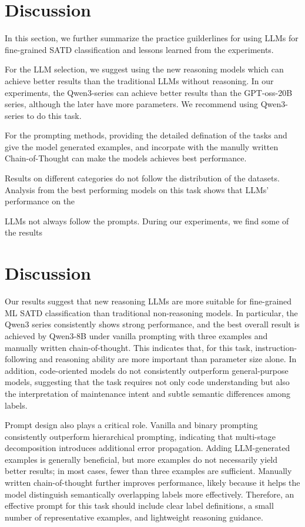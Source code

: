 \documentclass[acmsmall,screen,review,anonymous]{acmart}
\begin{document}
\section{Discussion}\label{sec:discussion}
In this section, we further summarize the practice guilderlines for using LLMs for fine-grained SATD classification and lessons learned from the experiments.

For the LLM selection, we suggest using the new reasoning models which can achieve better results than the traditional LLMs without reasoning. In our experiments, the Qwen3-series can achieve better results than the GPT-oss-20B series, although the later have more parameters. We recommend using Qwen3-series to do this task.

For the prompting methods, providing the detailed defination of the tasks and give the model generated examples, and incorpate with the manully written Chain-of-Thought can make the models achieves best performance.


Results on different categories do not follow the distribution of the datasets. Analysis from the best performing models on this task shows that LLMs' performance on the 

LLMs not always follow the prompts. During our experiments, we find some of the results 


\section{Discussion}\label{sec:discussion}

Our results suggest that new reasoning LLMs are more suitable for fine-grained ML SATD classification than traditional non-reasoning models. In particular, the Qwen3 series consistently shows strong performance, and the best overall result is achieved by Qwen3-8B under vanilla prompting with three examples and manually written chain-of-thought. This indicates that, for this task, instruction-following and reasoning ability are more important than parameter size alone. In addition, code-oriented models do not consistently outperform general-purpose models, suggesting that the task requires not only code understanding but also the interpretation of maintenance intent and subtle semantic differences among labels.

Prompt design also plays a critical role. Vanilla and binary prompting consistently outperform hierarchical prompting, indicating that multi-stage decomposition introduces additional error propagation. Adding LLM-generated examples is generally beneficial, but more examples do not necessarily yield better results; in most cases, fewer than three examples are sufficient. Manually written chain-of-thought further improves performance, likely because it helps the model distinguish semantically overlapping labels more effectively. Therefore, an effective prompt for this task should include clear label definitions, a small number of representative examples, and lightweight reasoning guidance.
\end{document}
